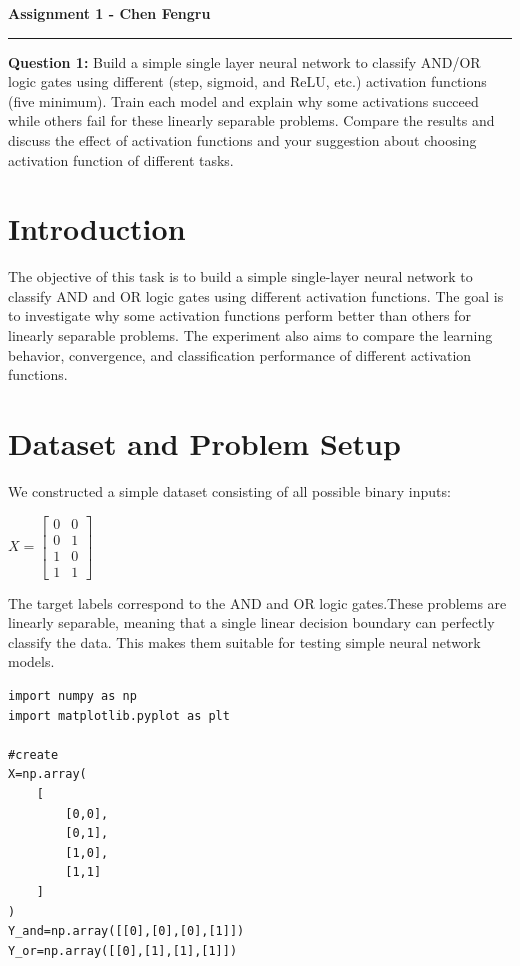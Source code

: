 \documentclass[11pt]{article}
\begin{document}
\noindent\textbf{\Large Assignment 1 - Chen Fengru} \\
\noindent\rule{\textwidth}{0.5pt}

\noindent\textbf{Question 1:} Build a simple single layer neural network to classify AND/OR logic gates using different (step, sigmoid, and ReLU, etc.)
 activation functions (five minimum). Train each model and explain why some activations succeed while others fail for these linearly separable problems. 
 Compare the results and discuss the effect of activation functions and your suggestion about choosing activation function of different tasks.

\section{Introduction}
The objective of this task is to build a simple single-layer neural network to classify AND and OR logic gates using different activation functions. 
The goal is to investigate why some activation functions perform better than others for linearly separable problems.
The experiment also aims to compare the learning behavior, convergence, and classification performance of different activation functions.

\section{Dataset and Problem Setup}
We constructed a simple dataset consisting of all possible binary inputs:


$X = 
\begin{bmatrix}
    0 & 0 \\
    0 & 1 \\ 
    1 & 0 \\
    1 & 1
\end{bmatrix}$

The target labels correspond to the AND and OR logic gates.These problems are linearly separable, 
meaning that a single linear decision boundary can perfectly classify the data.
This makes them suitable for testing simple neural network models.

\begin{lstlisting}[caption={Dataset and Problem Setup}]
import numpy as np
import matplotlib.pyplot as plt

#create
X=np.array(
    [
        [0,0],
        [0,1],
        [1,0],
        [1,1]
    ]
)
Y_and=np.array([[0],[0],[0],[1]])
Y_or=np.array([[0],[1],[1],[1]])
\end{lstlisting}
\end{document}
